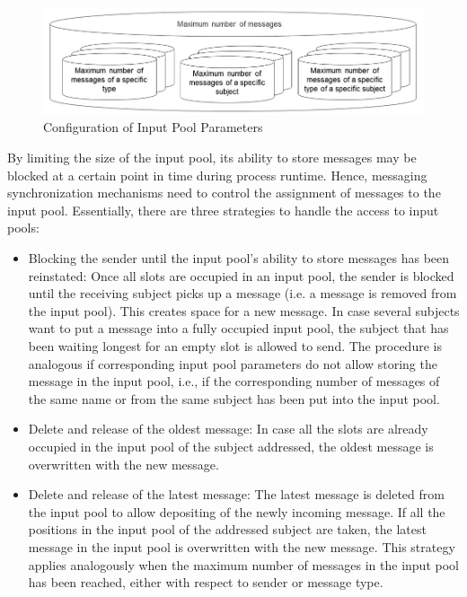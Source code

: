 \begin{figure}[ph]
	\centering
	\includegraphics[width=14cm]{20181026-Ontologie-Bilder/Grafiken-Ontologie/SUbject-Interaction/input-pool-informal.jpg}
	\caption[Input Pool]{Configuration of Input Pool Parameters}
	\label{fig:input-pool}
\end{figure}


By limiting the size of the input pool, its ability to store messages may be blocked at a certain point in time during process runtime. Hence, messaging synchronization mechanisms need to control the assignment of messages to the input pool. Essentially, there are three strategies to handle the access to input pools:
\begin{itemize}
	\item Blocking the sender until the input pool’s ability to store messages has been reinstated: Once all slots are occupied in an input pool, the sender is blocked until the receiving subject picks up a message (i.e. a message is removed from the input pool). This creates space for a new message. In case several subjects want to put a message into a fully occupied input pool, the subject that has been waiting longest for an empty slot is allowed to send. The procedure is analogous if corresponding input pool parameters do not allow storing the message in the input pool, i.e., if the corresponding number of messages of the same name or from the same subject has been put into the input pool.
	\item Delete and release of the oldest message: In case all the slots are already occupied in the input pool of the subject addressed, the oldest message is overwritten with the new message.
	\item Delete and release of the latest message: The latest message is deleted from the input pool to allow depositing of the newly incoming message. If all the positions in the input pool of the addressed subject are taken, the latest message in the input pool is overwritten with the new message. This strategy applies analogously when the maximum number of messages in the input pool has been reached, either with respect to sender or message type.
\end{itemize}

